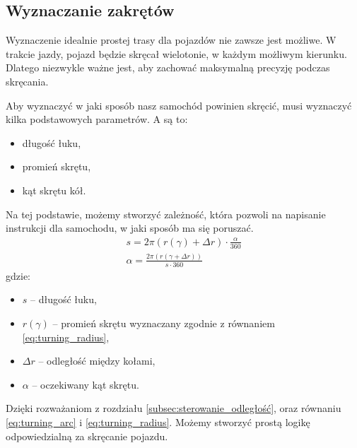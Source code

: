     \subsection{Wyznaczanie zakrętów}
        Wyznaczenie idealnie prostej trasy dla pojazdów nie zawsze jest możliwe.
        W trakcie jazdy, pojazd będzie skręcał wielotonie, w każdym możliwym kierunku.
        Dlatego niezwykle ważne jest, aby zachować maksymalną precyzję podczas skręcania.

        Aby wyznaczyć w jaki sposób nasz samochód powinien skręcić, musi wyznaczyć kilka podstawowych parametrów.
        A są to:
        \begin{itemize}
            \item długość łuku,
            \item promień skrętu,
            \item kąt skrętu kół.
        \end{itemize}
        Na tej podstawie, możemy stworzyć zależność, która pozwoli na napisanie instrukcji dla samochodu, w jaki sposób ma się poruszać.
        \begin{gather}
            s = 2\pi (r(\gamma) + \Delta r) \cdot \frac{\alpha}{360}
            \label{eq:turning_arc}
            \\
            \alpha = \frac{2\pi (r(\gamma + \Delta r))}{s \cdot 360}
        \end{gather}
        gdzie:
        \begin{itemize}
            \item $s$ -- długość łuku,
            \item $r(\gamma)$ -- promień skrętu wyznaczany zgodnie z równaniem \eqref{eq:turning_radius},
            \item $\Delta r$ -- odległość między kołami,
            \item $\alpha$ -- oczekiwany kąt skrętu.
        \end{itemize}

        Dzięki rozważaniom z rozdziału \ref{subsec:sterowanie_odległość}, oraz równaniu \eqref{eq:turning_arc} i \eqref{eq:turning_radius}.
        Możemy stworzyć prostą logikę odpowiedzialną za skręcanie pojazdu.


